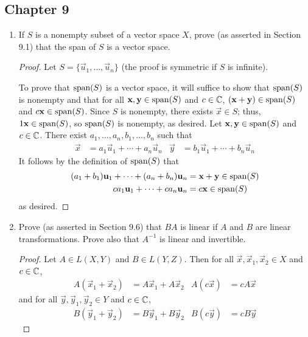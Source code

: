 \documentclass[../psets.tex]{subfiles}
\begin{document}
\subsection*{Chapter 9}
\begin{enumerate}[label={\textbf{\arabic*.}}]
    \item If $S$ is a nonempty subset of a vector space $X$, prove (as asserted in Section 9.1) that the span of $S$ is a vector space.
    \begin{proof}
        Let $S=\{\vec{u}_1,\dots,\vec{u}_n\}$ (the proof is symmetric if $S$ is infinite).\par
        To prove that $\operatorname{span}(S)$ is a vector space, it will suffice to show that $\operatorname{span}(S)$ is nonempty and that for all $\mathbf{x},\mathbf{y}\in\operatorname{span}(S)$ and $c\in\mathbb{C}$, $(\mathbf{x}+\mathbf{y})\in\operatorname{span}(S)$ and $c\mathbf{x}\in\operatorname{span}(S)$. Since $S$ is nonempty, there exists $\vec{x}\in S$; thus, $1\mathbf{x}\in\operatorname{span}(S)$, so $\operatorname{span}(S)$ is nonempty, as desired. Let $\mathbf{x},\mathbf{y}\in\operatorname{span}(S)$ and $c\in\mathbb{C}$. There exist $a_1,\dots,a_n,b_1,\dots,b_n$ such that
        \begin{align*}
            \vec{x} &= a_1\vec{u}_1+\cdots+a_n\vec{u}_n&
            \vec{y} &= b_1\vec{u}_1+\cdots+b_n\vec{u}_n
        \end{align*}
        It follows by the definition of $\operatorname{span}(S)$ that
        \begin{align*}
            (a_1+b_1)\mathbf{u}_1+\cdots+(a_n+b_n)\mathbf{u}_n &= \mathbf{x}+\mathbf{y} \in \operatorname{span}(S)\\
            ca_1\mathbf{u}_1+\cdots+ca_n\mathbf{u}_n &= c\mathbf{x} \in \operatorname{span}(S)
        \end{align*}
        as desired.
    \end{proof}
    \item Prove (as asserted in Section 9.6) that $BA$ is linear if $A$ and $B$ are linear transformations. Prove also that $A^{-1}$ is linear and invertible.
    \begin{proof}
        Let $A\in L(X,Y)$ and $B\in L(Y,Z)$. Then for all $\vec{x},\vec{x}_1,\vec{x}_2\in X$ and $c\in\mathbb{C}$,
        \begin{align*}
            A(\vec{x}_1+\vec{x}_2) &= A\vec{x}_1+A\vec{x}_2&
            A(c\vec{x}) &= cA\vec{x}
        \end{align*}
        and for all $\vec{y},\vec{y}_1,\vec{y}_2\in Y$ and $c\in\mathbb{C}$,
        \begin{align*}
            B(\vec{y}_1+\vec{y}_2) &= B\vec{y}_1+B\vec{y}_2&
            B(c\vec{y}) &= cB\vec{y}
        \end{align*}

\end{proof}
\end{enumerate}
\end{document}
